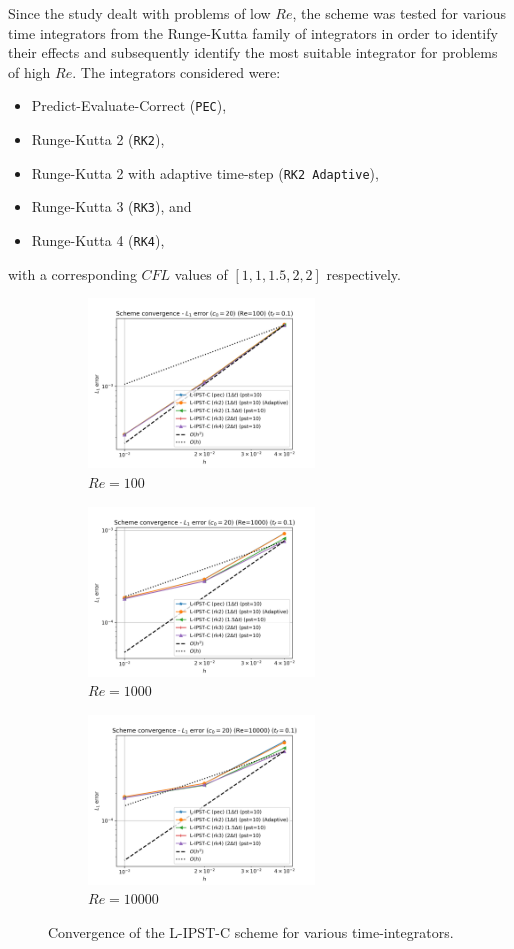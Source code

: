 Since the study dealt with problems of low $Re$, the scheme was tested for various time integrators from the Runge-Kutta family of integrators in order to identify their effects and subsequently identify the most suitable integrator for problems of high $Re$.
The integrators considered were:
\begin{itemize}
  \item Predict-Evaluate-Correct (\texttt{PEC}),
  \item Runge-Kutta 2 (\texttt{RK2}),
  \item Runge-Kutta 2 with adaptive time-step (\texttt{RK2 Adaptive}),
  \item Runge-Kutta 3 (\texttt{RK3}), and
  \item Runge-Kutta 4 (\texttt{RK4}),
\end{itemize}
with a corresponding $CFL$ values of $[1, 1, 1.5, 2, 2]$ respectively.

\begin{figure}[H]
  \begin{subfigure}{7cm}
    \centering\includegraphics[width=6cm]{Code-Figures/lipstc/integrator/dt_pois_conv_c0_20_re_100.png}
    \caption{$Re = 100$}
  \end{subfigure}
  \begin{subfigure}{7cm}
    \centering\includegraphics[width=6cm]{Code-Figures/lipstc/integrator/dt_pois_conv_c0_20_re_1000.png}
    \caption{$Re = 1000$}
  \end{subfigure}
  \begin{subfigure}{7cm}
    \centering\includegraphics[width=6cm]{Code-Figures/lipstc/integrator/dt_pois_conv_c0_20_re_10000.png}
    \caption{$Re = 10000$}
  \end{subfigure}
  \caption{Convergence of the L-IPST-C scheme for various time-integrators.}
  \label{fig:lipstc-integrator}
\end{figure}

